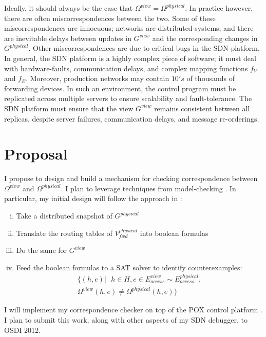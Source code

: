 \documentclass{sig-alternate-10pt}
\begin{document}
Ideally, it should always be the case that $\Omega^{view} = \Omega^{physical}$.
In practice however, there are often miscorrespondences between the two. Some
of these miscorrespondences are innocuous; networks are distributed systems,
and there are inevitable delays between updates in $G^{view}$ and the
corresponding changes in $G^{physical}$. Other miscorrespondences are
due to critical bugs in the SDN platform. In general, the SDN platform is a
highly complex piece of software; it must deal with hardware-faults,
communication delays, and complex mapping functions $f_{V}$ and $f_{E}$. 
Moreover, production networks may contain  $10's$ of thousands of
forwarding devices. In such an environment, the control program must be
replicated across multiple servers to ensure scalability and fault-tolerance. 
The SDN platform must ensure that the view $G^{view}$ remains consistent
between all replicas, despite server failures, communication delays, and
message re-orderings.

\section{Proposal}

I propose to design and build a mechanism for checking 
correspondence between $\Omega^{view}$ and $\Omega^{physical}$.
I plan to leverage techniques from model-checking \cite{symbolicmodel}.
In particular, my initial design will follow the approach in \cite{Anteater}:
\begin{enumerate}[i.]
\item Take a distributed snapshot of $G^{physical}$ \cite{distributedsnapshots}
\item Translate the routing tables of $V_{fwd}^{physical}$ into boolean
formulas
\item Do the same for $G^{view}$
\item Feed the boolean formulas to a SAT solver to identify
counterexamples:
\begin{align*}
 \{ (h,e) |\text{ } h \in H, e \in E^{view}_{access} \sim
 E^{physical}_{access}, \\
 \Omega^{view}(h,e) \neq  \Omega^{physical}(h,e) \}
\end{align*}
\end{enumerate}

I will implement my correspondence checker on top of the POX control platform
\cite{POX}.
I plan to submit this work, along with other aspects of my SDN debugger, to
OSDI 2012.

\scriptsize



%
\end{document}
